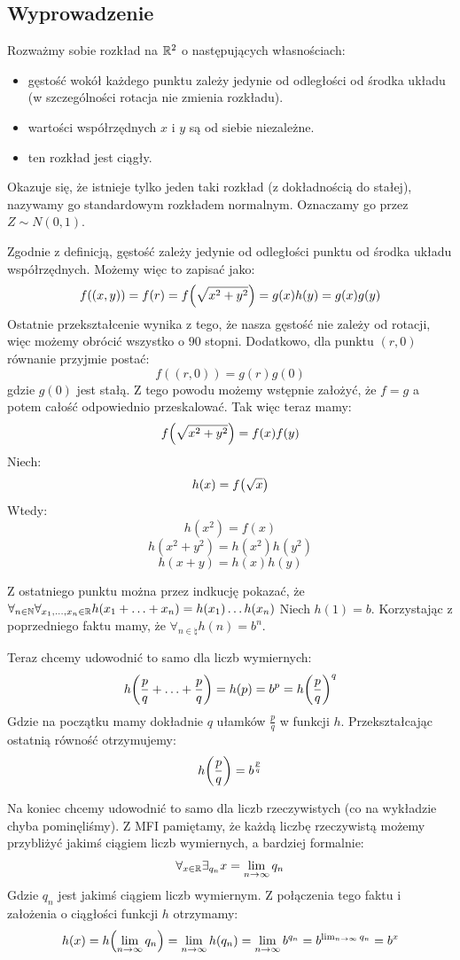 \subsection{Wyprowadzenie}
Rozważmy sobie rozkład na \(\mathbb{R}^2\) o następujących własnościach:
\begin{itemize}
	\item gęstość wokół każdego punktu zależy jedynie od odległości od środka układu (w szczególności rotacja nie zmienia rozkładu).
	\item wartości współrzędnych \(x\) i \(y\) są od siebie niezależne.
	\item ten rozkład jest ciągły.
\end{itemize}

Okazuje się, że istnieje tylko jeden taki rozkład (z dokładnością do stałej), nazywamy go standardowym rozkładem normalnym. Oznaczamy go przez \( Z \sim N(0,1) \).

Zgodnie z definicją, gęstość zależy jedynie od odległości punktu od środka układu współrzędnych. Możemy więc to zapisać jako:
\[
	f((x, y)) = f(r) = f\pars{\sqrt{x^2 + y^2}} = g(x)h(y) = g(x)g(y)
\]
Ostatnie przekształcenie wynika z tego, że nasza gęstość nie zależy od rotacji, więc możemy obrócić wszystko o \(90\) stopni.
Dodatkowo, dla punktu \((r, 0 )\) równanie przyjmie postać:
\[
	f((r, 0)) = g(r)g(0)
\]
gdzie \( g(0) \) jest stałą. Z tego powodu możemy wstępnie założyć, że \( f = g \) a potem całość odpowiednio przeskalować. Tak więc teraz mamy:
\[
	f\pars{\sqrt{x^2 + y^2}} = f(x)f(y)
\]
Niech:
\[
	h(x) = f\pars{\sqrt{x}}
\]
Wtedy:
\[ h(x^2) = f(x) \]
\[ h(x^2 + y^2) = h(x^2)h(y^2) \]
\[ h(x + y) = h(x)h(y) \]

Z ostatniego punktu można przez indkucję pokazać, że \( \forall_{n \in \mathbb{N}} \forall_{x_1, \ldots, x_n \in \mathbb{R}} h(x_1 + \ldots + x_n) = h(x_1)\ldots h(x_n) \)
Niech \( h(1) = b \). Korzystając z poprzedniego faktu mamy, że \(\forall_{n \in \natural} h(n) = b^n \).

Teraz chcemy udowodnić to samo dla liczb wymiernych:
\[
	h\pars{\frac{p}{q} + \ldots + \frac{p}{q}} = h(p) = b^p = h\pars{\frac{p}{q}}^q
\]
Gdzie na początku mamy dokładnie \(q\) ułamków \( \frac{p}{q} \) w funkcji \(h\).
Przekształcając ostatnią równość otrzymujemy:
\[
	h\pars{\frac{p}{q}} = b^{\frac{p}{q}}
\]

Na koniec chcemy udowodnić to samo dla liczb rzeczywistych (co na wykładzie chyba pominęliśmy).
Z MFI pamiętamy, że każdą liczbę rzeczywistą możemy przybliżyć jakimś ciągiem liczb wymiernych, a bardziej formalnie:
\[
	\forall_{x \in \mathbb{R}} \exists_{q_n} x = \lim_{n \to \infty} q_n
\]
Gdzie \( q_n \) jest jakimś ciągiem liczb wymiernym. Z połączenia tego faktu i założenia o ciągłości funkcji \(h\) otrzymamy:
\[
	h(x) = h\pars{\lim_{n \to \infty} q_n} = \lim_{n \to \infty}h(q_n) = \lim_{n \to \infty} b^{q_n} = b^{\lim_{n \to \infty} q_n} = b^x
\]

